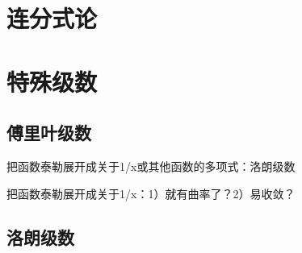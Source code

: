 \documentclass[UTF8]{../../09-Mathematics}
\begin{document}
\section{连分式论}



\section{特殊级数}


\subsection{傅里叶级数}

把函数泰勒展开成关于1/x或其他函数的多项式：洛朗级数

把函数泰勒展开成关于1/x：1）就有曲率了？2）易收敛？

\subsection{洛朗级数}
\end{document}
